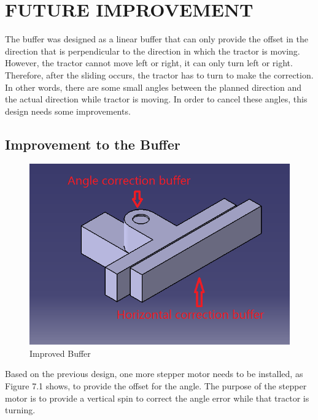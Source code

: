 \chapter{FUTURE IMPROVEMENT}

The buffer was designed as a linear buffer that can only provide the offset in the direction that is perpendicular to the direction in which the tractor is moving. However, the tractor cannot move left or right, it can only turn left or right. Therefore, after the sliding occurs, the tractor has to turn to make the correction. In other words, there are some small angles between the planned direction and the actual direction while tractor is moving. In order to cancel these angles, this design needs some improvements.

\section{Improvement to the Buffer}
\begin{figure}[ht!]
\begin{center}
\includegraphics[scale = 0.8]{pics/improvedbuffer.png}
\caption{Improved Buffer}
\end{center}
\end{figure}
Based on the previous design, one more stepper motor needs to be installed, as Figure 7.1 shows, to provide the offset for the angle. The purpose of the stepper motor is to provide a vertical spin to correct the angle error while that tractor is turning. 

